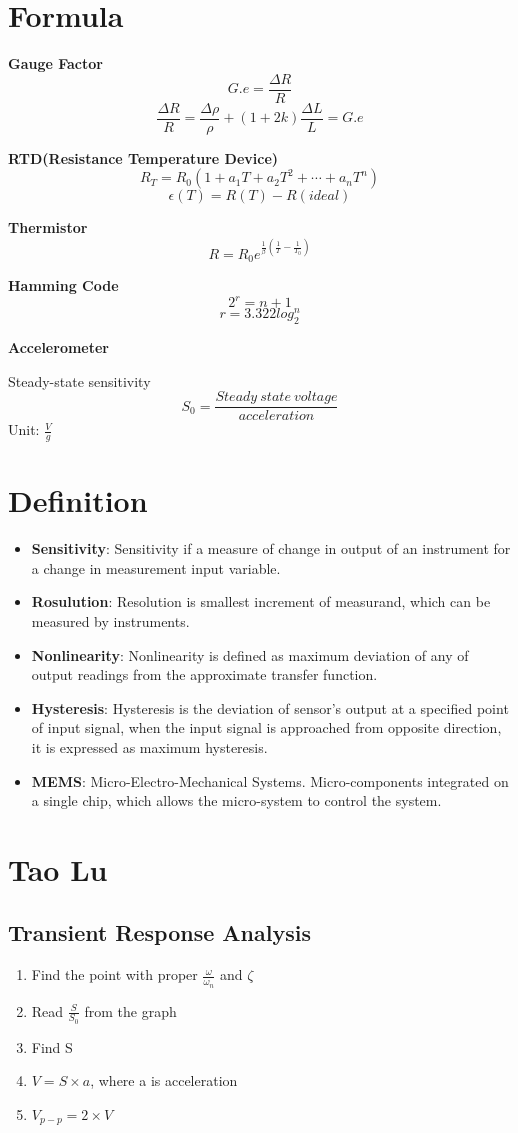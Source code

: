 \documentclass{article}
\begin{document}
\Large
  \section{Formula}
\textbf{Gauge Factor} $$ G.e = \frac{\Delta R}{R} $$
$$\frac{\Delta R}{R} = \frac{\Delta \rho}{\rho} + (1+2k)\frac{\Delta L}{L} = G.e$$

\textbf{RTD(Resistance Temperature Device)} 
$$R_T = R_0(1+a_1T + a_2T^2 + \cdots + a_nT^n)$$
$$\epsilon(T) = R(T) - R(ideal)$$


\textbf{Thermistor}
$$R = R_0e^{\frac{1}{\beta}(\frac{1}{T} - \frac{1}{T_0})}$$

\textbf{Hamming Code}
$$2^r = n+1$$
$$ r = 3.322log_2^n$$

\textbf{Accelerometer}

Steady-state sensitivity
$$ S_0 = \frac{Steady\ state \ voltage}{acceleration} $$ Unit: $\frac{V}{g}$
   \section{Definition}
   \begin{itemize}
    \item \textbf{Sensitivity}: Sensitivity if a measure of change in output of an instrument for a change in measurement input variable.
    \item \textbf{Rosulution}: Resolution is smallest increment of measurand, which can be measured by instruments.
    
    \item \textbf{Nonlinearity}: Nonlinearity is defined as maximum deviation of any of output readings from the approximate transfer function.
    
    \item \textbf{Hysteresis}: Hysteresis is the deviation of sensor's output at a specified point of input signal, when the input signal is approached from opposite direction, it is expressed as maximum hysteresis.
    
    \item \textbf{MEMS}: Micro-Electro-Mechanical Systems. Micro-components integrated on a single chip, which allows the micro-system to control the system.
   \end{itemize}
\section{Tao Lu}
  \subsection{Transient Response Analysis}
  \begin{enumerate}
   \item Find the point with proper $\frac{\omega}{\omega_n}$ and $\zeta$
   \item Read $\frac{S}{S_0}$ from the graph
   \item Find S
   \item $V = S \times a$, where a is acceleration
   \item $V_{p-p} = 2\times V$
  \end{enumerate}  
  
\end{document}
